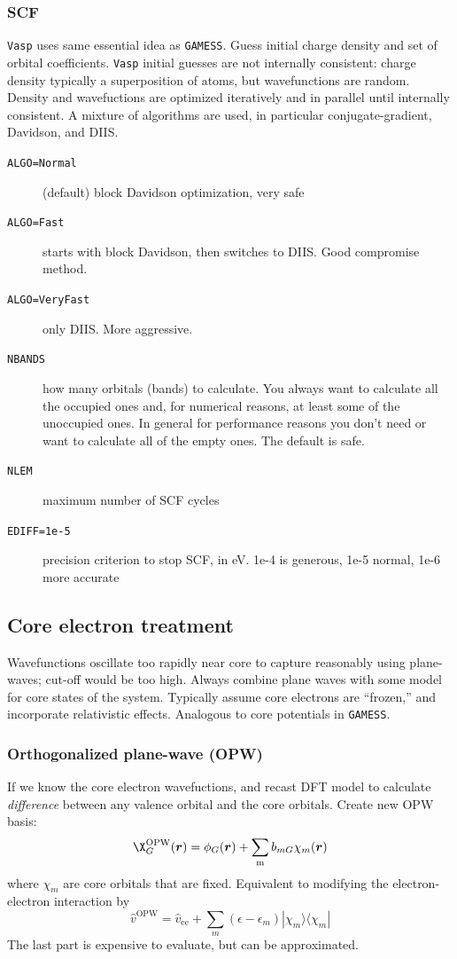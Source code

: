 \documentclass[11pt]{article}
\begin{document}
\subsubsection{SCF}
\label{sec:org1034090}
\texttt{Vasp} uses same essential idea as \texttt{GAMESS}. Guess initial charge density and set of orbital coefficients. \texttt{Vasp} initial guesses are not internally consistent: charge density typically a superposition of atoms, but wavefunctions are random.  Density and wavefuctions are optimized iteratively and in parallel until internally consistent. A mixture of algorithms are used, in particular conjugate-gradient, Davidson, and DIIS. 
\begin{description}
\item[{\texttt{ALGO=Normal}}] (default) block Davidson optimization, very safe
\item[{\texttt{ALGO=Fast}}] starts with block Davidson, then switches to DIIS.  Good compromise method.
\item[{\texttt{ALGO=VeryFast}}] only DIIS.  More aggressive.
\item[{\texttt{NBANDS}}] how many orbitals (bands) to calculate. You always want to calculate all the occupied ones and, for numerical reasons, at least some of the unoccupied ones. In general for performance reasons you don’t need or want to calculate all of the empty ones. The default is safe.
\item[{\texttt{NLEM}}] maximum number of SCF cycles
\item[{\texttt{EDIFF=1e-5}}] precision criterion to stop SCF, in eV.  1e-4 is generous, 1e-5 normal, 1e-6 more accurate
\end{description}
\subsection{Core electron treatment}
\label{sec:org8c34ab1}
Wavefunctions oscillate too rapidly near core to capture reasonably using plane-waves; cut-off would be too high. Always combine plane waves with some model for core states of the system.  Typically assume core electrons are ``frozen,'' and incorporate relativistic effects. Analogous to core potentials in \texttt{GAMESS}.
\subsubsection{Orthogonalized plane-wave (OPW)}
\label{sec:org38637cb}
If we know the core electron wavefuctions, and recast DFT model to calculate \emph{difference} between any valence orbital and the core orbitals.  Create new OPW basis:
\[ \X_G^\text{OPW}(\bm{r}) = \phi_G(\bm{r}) + \sum_\text{m} b_{mG} \chi_m(\bm{r}) \]
where \(\chi_m\) are core orbitals that are fixed. Equivalent to modifying the electron-electron interaction by
\[ \hat{v}^\text{OPW} = \hat{v}_\text{ee} + \sum_m (\epsilon - \epsilon_m) |\chi_m\rangle\langle\chi_m| \]
The last part is expensive to evaluate, but can be approximated.
\end{document}
